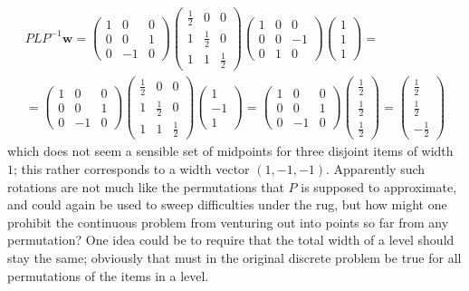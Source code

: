 \documentclass{article}
\newcommand{\vek}{\mathbf}
\theoremstyle{definition}
\begin{document}
\begin{multline*}
  P L P^{-1} \vek{w} =
  \begin{pmatrix} 1&0&0 \\ 0&0&1 \\ 0&-1&0 \end{pmatrix}
  \begin{pmatrix} \frac{1}{2} & 0 & 0\\ 1 & \frac{1}{2} & 0 \\
    1 & 1 & \frac{1}{2} \end{pmatrix}
  \begin{pmatrix} 1&0&0 \\ 0&0&-1 \\ 0&1&0 \end{pmatrix}
  \begin{pmatrix} 1 \\ 1 \\ 1 \end{pmatrix}
  = \\ =
  \begin{pmatrix} 1&0&0 \\ 0&0&1 \\ 0&-1&0 \end{pmatrix}
  \begin{pmatrix} \frac{1}{2} & 0 & 0\\ 1 & \frac{1}{2} & 0 \\
    1 & 1 & \frac{1}{2} \end{pmatrix}
  \begin{pmatrix} 1 \\ -1 \\ 1 \end{pmatrix}
  = 
  \begin{pmatrix} 1&0&0 \\ 0&0&1 \\ 0&-1&0 \end{pmatrix}
  \begin{pmatrix} \frac{1}{2} \\ \frac{1}{2} \\ \frac{1}{2} \end{pmatrix}
  = 
  \begin{pmatrix} \frac{1}{2} \\ \frac{1}{2} \\ -\frac{1}{2} \end{pmatrix}
\end{multline*}
which does not seem a sensible set of midpoints for three disjoint 
items of width $1$; this rather corresponds to a width vector 
$(1,-1,-1)$. Apparently such rotations are not much like the 
permutations that $P$ is supposed to approximate, and could again be 
used to sweep difficulties under the rug, but how might one prohibit 
the continuous problem from venturing out into points so far from any 
permutation? One idea could be to require that the total width of a 
level should stay the same; obviously that must in the original 
discrete problem be true for all permutations of the items in a level.
\end{document}
